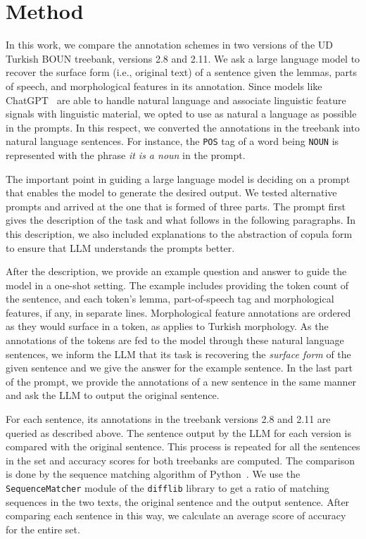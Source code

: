 \section{Method}
\label{sec:method}

In this work, we compare the annotation schemes in two versions of the UD Turkish BOUN treebank, versions 2.8 and 2.11.
We ask a large language model to recover the surface form (i.e., original text) of a sentence given the lemmas, parts of speech, and morphological features in its annotation.
Since models like ChatGPT~\cite{openai2021gpt35} are able to handle natural language and associate linguistic feature signals with linguistic material, we opted to use as natural a language as possible in the prompts.
In this respect, we converted the annotations in the treebank into natural language sentences.
For instance, the \texttt{POS} tag of a word being \texttt{NOUN} is represented with the phrase \textit{it is a noun} in the prompt.

The important point in guiding a large language model is deciding on a prompt that enables the model to generate the desired output.
We tested alternative prompts and arrived at the one that is formed of three parts.
The prompt first gives the description of the task and what follows in the following paragraphs.
In this description, we also included explanations to the abstraction of copula form to ensure that LLM understands the prompts better.

After the description, we provide an example question and answer to guide the model in a one-shot setting.
The example includes providing the token count of the sentence, and each token's lemma, part-of-speech tag and morphological features, if any, in separate lines.
Morphological feature annotations are ordered as they would surface in a token, as applies to Turkish morphology.
As the annotations of the tokens are fed to the model through these natural language sentences, we inform the LLM that its task is recovering the \textit{surface form} of the given sentence and we give the answer for the example sentence.
In the last part of the prompt, we provide the annotations of a new sentence in the same manner and ask the LLM to output the original sentence.

For each sentence, its annotations in the treebank versions 2.8 and 2.11 are queried as described above.
The sentence output by the LLM for each version is compared with the original sentence.
This process is repeated for all the sentences in the set and accuracy scores for both treebanks are computed.
The comparison is done by the sequence matching algorithm of Python~\cite{python}.
We use the \texttt{SequenceMatcher} module of the \texttt{difflib} library to get a ratio of matching sequences in the two texts, the original sentence and the output sentence.
After comparing each sentence in this way, we calculate an average score of accuracy for the entire set.

